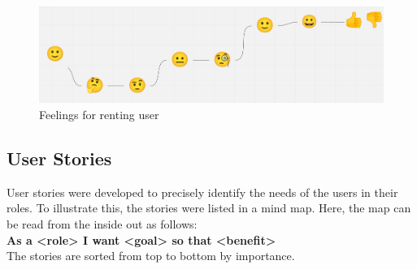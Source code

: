 			\begin{figure}[H]
				\centering
				\includegraphics[width=\linewidth]{abb/2_context_of_use/feelings_lending.png}
				\caption{Feelings for renting user}
				\label{fig:ujm_lending_feelings}
			\end{figure}

\subsection{User Stories}


User stories were developed to precisely identify the needs of the users in their roles. To illustrate this, the stories were listed in a mind map. Here, the map can be read from the inside out as follows:\\
\textbf {As a \colorbox{role}{<role>} I want \colorbox{goal}{<goal>} so that \colorbox{benefit}{<benefit>}}\\
The stories are sorted from top to bottom by importance.

